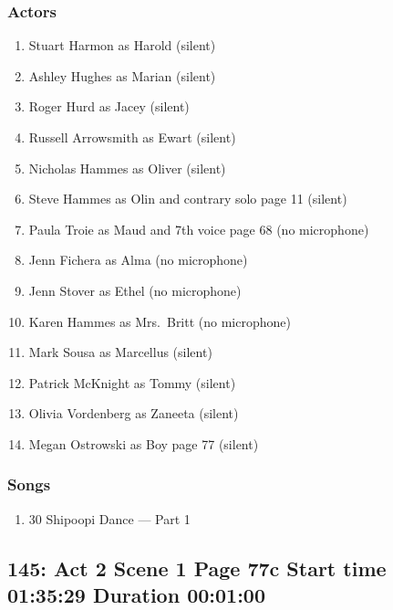 \subsubsection{Actors}
\begin{enumerate}
\item Stuart Harmon as Harold (silent)
\item Ashley Hughes as Marian (silent)
\item Roger Hurd as Jacey (silent)
\item Russell Arrowsmith as Ewart (silent)
\item Nicholas Hammes as Oliver (silent)
\item Steve Hammes as Olin and contrary solo page 11 (silent)
\item Paula Troie as Maud and 7th voice page 68 (no microphone)
\item Jenn Fichera as Alma (no microphone)
\item Jenn Stover as Ethel (no microphone)
\item Karen Hammes as Mrs.~Britt (no microphone)
\item Mark Sousa as Marcellus (silent)
\item Patrick McKnight as Tommy (silent)
\item Olivia Vordenberg as Zaneeta (silent)
\item Megan Ostrowski as Boy page 77 (silent)
\end{enumerate}

\subsubsection{Songs}
\begin{enumerate}
\item 30 Shipoopi Dance --- Part 1
\end{enumerate}
\subsection{145: Act 2 Scene 1 Page 77c Start time 01:35:29 Duration 00:01:00}

